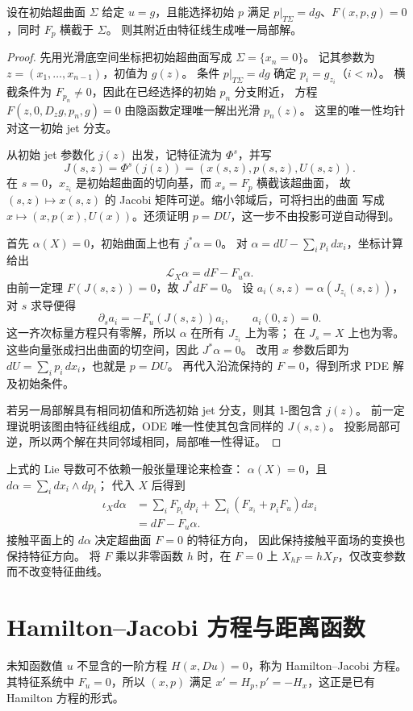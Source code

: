 \begin{theorem}[非特征初始数据的局部构造]
设在初始超曲面 $\Sigma$ 给定 $u=g$，且能选择初始 $p$ 满足
$p|_{T\Sigma}=dg$、$F(x,p,g)=0$，同时 $F_p$ 横截于 $\Sigma$。
则其附近由特征线生成唯一局部解。
\end{theorem}
\begin{proof}
先用光滑底空间坐标把初始超曲面写成 $\Sigma=\{x_n=0\}$。
记其参数为 $z=(x_1,\ldots,x_{n-1})$，初值为 $g(z)$。
条件 $p|_{T\Sigma}=dg$ 确定 $p_i=g_{z_i}$（$i<n$）。
横截条件为 $F_{p_n}\ne0$，因此在已经选择的初始 $p_n$ 分支附近，
方程 $F(z,0,D_zg,p_n,g)=0$ 由隐函数定理唯一解出光滑 $p_n(z)$。
这里的唯一性均针对这一初始 jet 分支。

从初始 jet 参数化 $j(z)$ 出发，记特征流为 $\Phi^s$，并写
\[
 J(s,z)=\Phi^s(j(z))=(x(s,z),p(s,z),U(s,z)).
\]
在 $s=0$，$x_{z_i}$ 是初始超曲面的切向基，而 $x_s=F_p$ 横截该超曲面，
故 $(s,z)\mapsto x(s,z)$ 的 Jacobi 矩阵可逆。缩小邻域后，可将扫出的曲面
写成 $x\mapsto(x,p(x),U(x))$。还须证明 $p=DU$，这一步不由投影可逆自动得到。

首先 $\alpha(X)=0$，初始曲面上也有 $j^*\alpha=0$。
对 $\alpha=dU-\sum_ip_i\,dx_i$，坐标计算给出
\[
 \mathcal L_X\alpha=dF-F_u\alpha.
\]
由前一定理 $F(J(s,z))=0$，故 $J^*dF=0$。
设 $a_i(s,z)=\alpha(J_{z_i}(s,z))$，对 $s$ 求导便得
\[
 \partial_sa_i=-F_u(J(s,z))a_i,\qquad a_i(0,z)=0.
\]
这一齐次标量方程只有零解，所以 $\alpha$ 在所有 $J_{z_i}$ 上为零；
在 $J_s=X$ 上也为零。这些向量张成扫出曲面的切空间，因此 $J^*\alpha=0$。
改用 $x$ 参数后即为 $dU=\sum_ip_i\,dx_i$，也就是 $p=DU$。
再代入沿流保持的 $F=0$，得到所求 PDE 解及初始条件。

若另一局部解具有相同初值和所选初始 jet 分支，则其 1-图包含 $j(z)$。
前一定理说明该图由特征线组成，ODE 唯一性使其包含同样的 $J(s,z)$。
投影局部可逆，所以两个解在共同邻域相同，局部唯一性得证。
\end{proof}
上式的 Lie 导数可不依赖一般张量理论来检查：
$\alpha(X)=0$，且 $d\alpha=\sum_i dx_i\wedge dp_i$；
代入 $X$ 后得到
\begin{align*}
 \iota_Xd\alpha
 &=\sum_iF_{p_i}dp_i+\sum_i(F_{x_i}+p_iF_u)dx_i\\
 &=dF-F_u\alpha.
\end{align*}
接触平面上的 $d\alpha$ 决定超曲面 $F=0$ 的特征方向，
因此保持接触平面场的变换也保持特征方向。
将 $F$ 乘以非零函数 $h$ 时，在 $F=0$ 上 $X_{hF}=hX_F$，仅改变参数而不改变特征曲线。

\section{Hamilton--Jacobi 方程与距离函数}
\begin{definition}
未知函数值 $u$ 不显含的一阶方程 $H(x,Du)=0$，称为 Hamilton--Jacobi 方程。
其特征系统中 $F_u=0$，所以 $(x,p)$ 满足
$x'=H_p,p'=-H_x$，这正是已有 Hamilton 方程的形式。
\end{definition}


